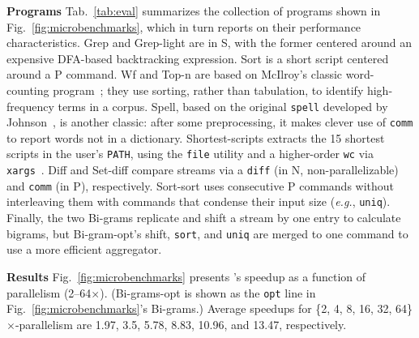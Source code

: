 \documentclass[letterpaper,twocolumn,10pt]{article}
\newcommand{\eg}{{\em e.g.}, }
\newcommand{\heading}[1]{\vspace{4pt}\noindent\textbf{#1}\enspace}
\newcommand{\ttt}[1]{\texttt{#1}}
\newcommand{\cn}[1]{\mbox{\textcircled{\footnotesize #1}}}
\newcommand{\sta}{\cn{\textsc{S}}\xspace}
\newcommand{\pur}{\cn{\textsc{P}}\xspace}
\newcommand{\npu}{\cn{\textsc{N}}\xspace}
\newcommand{\nv}[1]{[{\color{cyan}nv: #1}]}
\newcommand{\kk}[1]{[{\color{magenta}kk: #1}]}
\newcommand{\tr}[1]{} %
\begin{document}
\heading{Programs}
Tab.~\ref{tab:eval} summarizes the collection of programs shown in Fig.~\ref{fig:microbenchmarks}, which in turn reports on their performance characteristics.
Grep and Grep-light are in \sta, with the former centered around an expensive DFA-based backtracking expression.
Sort is a short script centered around a \pur command.
Wf and Top-n are based on McIlroy's classic word-counting program~\cite{bentley1986literate};
  they use sorting, rather than tabulation, to identify high-frequency terms in a corpus.
Spell, based on the original \ttt{spell} developed by Johnson~\cite{bentley1985spelling}, is another \unix classic:
  after some preprocessing, it makes clever use of \ttt{comm} to report words not in a dictionary.
Shortest-scripts extracts the 15 shortest scripts in the user's \ttt{PATH}, using the \ttt{file} utility and a higher-order \ttt{wc} via \ttt{xargs}~\cite[pg. 7]{taylor2004wicked}.
Diff and Set-diff compare streams via a \ttt{diff} (in \npu, non-parallelizable) and \ttt{comm} (in \pur), respectively.
Sort-sort uses consecutive \pur commands without interleaving them with commands that condense their input size (\eg \ttt{uniq}).
Finally, the two Bi-grams replicate and shift a stream by one entry to calculate bigrams, but Bi-gram-opt's shift, \ttt{sort}, and \ttt{uniq} are merged to one command to use a more efficient aggregator.

\heading{Results}
Fig.~\ref{fig:microbenchmarks} presents \sys's speedup as a function of parallelism (2--64$\times$).
(Bi-grams-opt is shown as the \ttt{opt} line in Fig.~\ref{fig:microbenchmarks}'s Bi-grams.)
Average speedups for \{2, 4, 8, 16, 32, 64\}$\times$-parallelism are 1.97, 3.5, 5.78, 8.83, 10.96, and 13.47, respectively.
\end{document}

